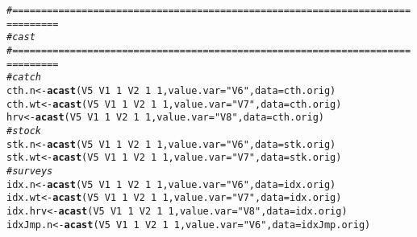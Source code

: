 \documentclass[a4paper,english,10pt]{article}\usepackage[]{graphicx}\usepackage[]{color}
\makeatletter
\newcommand{\hlnum}[1]{\textcolor[rgb]{0.686,0.059,0.569}{#1}}%
\newcommand{\hlstr}[1]{\textcolor[rgb]{0.192,0.494,0.8}{#1}}%
\newcommand{\hlcom}[1]{\textcolor[rgb]{0.678,0.584,0.686}{\textit{#1}}}%
\newcommand{\hlopt}[1]{\textcolor[rgb]{0,0,0}{#1}}%
\newcommand{\hlstd}[1]{\textcolor[rgb]{0.345,0.345,0.345}{#1}}%
\newcommand{\hlkwb}[1]{\textcolor[rgb]{0.69,0.353,0.396}{#1}}%
\newcommand{\hlkwc}[1]{\textcolor[rgb]{0.333,0.667,0.333}{#1}}%
\newcommand{\hlkwd}[1]{\textcolor[rgb]{0.737,0.353,0.396}{\textbf{#1}}}%
\newenvironment{kframe}{%
 \def\at@end@of@kframe{}%
 \ifinner\ifhmode%
  \def\at@end@of@kframe{\end{minipage}}%
  \begin{minipage}{\columnwidth}%
 \fi\fi%
 \def\FrameCommand##1{\hskip\@totalleftmargin \hskip-\fboxsep
 \colorbox{shadecolor}{##1}\hskip-\fboxsep
     \hskip-\linewidth \hskip-\@totalleftmargin \hskip\columnwidth}%
 \MakeFramed {\advance\hsize-\width
   \@totalleftmargin\z@ \linewidth\hsize
   \@setminipage}}%
 {\par\unskip\endMakeFramed%
 \at@end@of@kframe}
\newenvironment{knitrout}{}{} %
\makeatother
\begin{document}
\begin{knitrout}
\color{fgcolor}\begin{kframe}
\begin{alltt}
\hlcom{# ==============================================================================}
\hlcom{# cast}
\hlcom{# ==============================================================================}
\hlcom{# catch}
\hlstd{cth.n} \hlkwb{<-} \hlkwd{acast}\hlstd{(V5} \hlopt{~} \hlstd{V1} \hlopt{~} \hlnum{1} \hlopt{~} \hlstd{V2} \hlopt{~} \hlnum{1} \hlopt{~} \hlnum{1}\hlstd{,} \hlkwc{value.var} \hlstd{=} \hlstr{"V6"}\hlstd{,} \hlkwc{data} \hlstd{= cth.orig)}
\hlstd{cth.wt} \hlkwb{<-} \hlkwd{acast}\hlstd{(V5} \hlopt{~} \hlstd{V1} \hlopt{~} \hlnum{1} \hlopt{~} \hlstd{V2} \hlopt{~} \hlnum{1} \hlopt{~} \hlnum{1}\hlstd{,} \hlkwc{value.var} \hlstd{=} \hlstr{"V7"}\hlstd{,} \hlkwc{data} \hlstd{= cth.orig)}
\hlstd{hrv} \hlkwb{<-} \hlkwd{acast}\hlstd{(V5} \hlopt{~} \hlstd{V1} \hlopt{~} \hlnum{1} \hlopt{~} \hlstd{V2} \hlopt{~} \hlnum{1} \hlopt{~} \hlnum{1}\hlstd{,} \hlkwc{value.var} \hlstd{=} \hlstr{"V8"}\hlstd{,} \hlkwc{data} \hlstd{= cth.orig)}
\hlcom{# stock}
\hlstd{stk.n} \hlkwb{<-} \hlkwd{acast}\hlstd{(V5} \hlopt{~} \hlstd{V1} \hlopt{~} \hlnum{1} \hlopt{~} \hlstd{V2} \hlopt{~} \hlnum{1} \hlopt{~} \hlnum{1}\hlstd{,} \hlkwc{value.var} \hlstd{=} \hlstr{"V6"}\hlstd{,} \hlkwc{data} \hlstd{= stk.orig)}
\hlstd{stk.wt} \hlkwb{<-} \hlkwd{acast}\hlstd{(V5} \hlopt{~} \hlstd{V1} \hlopt{~} \hlnum{1} \hlopt{~} \hlstd{V2} \hlopt{~} \hlnum{1} \hlopt{~} \hlnum{1}\hlstd{,} \hlkwc{value.var} \hlstd{=} \hlstr{"V7"}\hlstd{,} \hlkwc{data} \hlstd{= stk.orig)}
\hlcom{# surveys}
\hlstd{idx.n} \hlkwb{<-} \hlkwd{acast}\hlstd{(V5} \hlopt{~} \hlstd{V1} \hlopt{~} \hlnum{1} \hlopt{~} \hlstd{V2} \hlopt{~} \hlnum{1} \hlopt{~} \hlnum{1}\hlstd{,} \hlkwc{value.var} \hlstd{=} \hlstr{"V6"}\hlstd{,} \hlkwc{data} \hlstd{= idx.orig)}
\hlstd{idx.wt} \hlkwb{<-} \hlkwd{acast}\hlstd{(V5} \hlopt{~} \hlstd{V1} \hlopt{~} \hlnum{1} \hlopt{~} \hlstd{V2} \hlopt{~} \hlnum{1} \hlopt{~} \hlnum{1}\hlstd{,} \hlkwc{value.var} \hlstd{=} \hlstr{"V7"}\hlstd{,} \hlkwc{data} \hlstd{= idx.orig)}
\hlstd{idx.hrv} \hlkwb{<-} \hlkwd{acast}\hlstd{(V5} \hlopt{~} \hlstd{V1} \hlopt{~} \hlnum{1} \hlopt{~} \hlstd{V2} \hlopt{~} \hlnum{1} \hlopt{~} \hlnum{1}\hlstd{,} \hlkwc{value.var} \hlstd{=} \hlstr{"V8"}\hlstd{,} \hlkwc{data} \hlstd{= idx.orig)}
\hlstd{idxJmp.n} \hlkwb{<-} \hlkwd{acast}\hlstd{(V5} \hlopt{~} \hlstd{V1} \hlopt{~} \hlnum{1} \hlopt{~} \hlstd{V2} \hlopt{~} \hlnum{1} \hlopt{~} \hlnum{1}\hlstd{,} \hlkwc{value.var} \hlstd{=} \hlstr{"V6"}\hlstd{,} \hlkwc{data} \hlstd{= idxJmp.orig)}

\end{alltt}
\end{kframe}
\end{knitrout}
\end{document}
